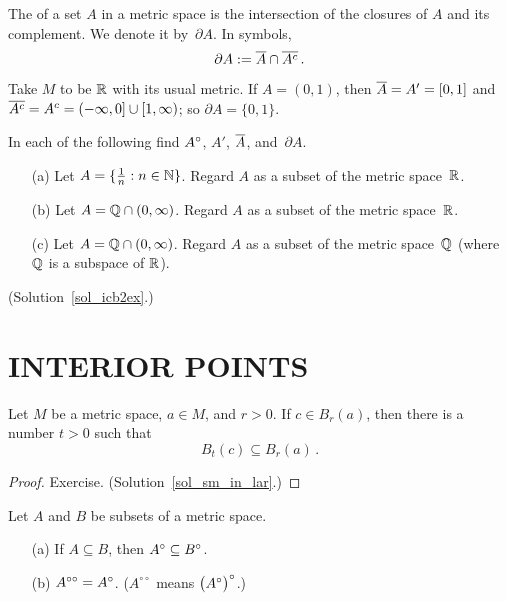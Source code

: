 \begin{defn} The
 of a set $A$ in a metric space is the intersection of the closures of $A$ and
its complement. We denote it
by~$\partial A$. In symbols,
  \[ \partial A := \overline{A} \cap \overline{A^c}\,. \]
\end{defn}

\begin{exam} Take $M$ to be $\mathbb{R}$ with its usual metric. If $A = (0,1)$, then $\overline{A} = A' =
[0,1]$ and $\overline{A^c} = A^c = (-\infty,0] \cup [1,\infty)$; so $\partial A = \{0,1\}$.
\end{exam}

\begin{exer}\label{icb2ex} In each of the following find $A^{\circ}$, $A'$, $\overline{A}$, and~$\partial A$.
 \begin{enumerate}
  \item[(a)] Let $A = \{\frac1n: n \in \mathbb{N}\}$. Regard $A$ as a subset of the metric space~$\mathbb{R}$.
  \item[(b)] Let $A = \mathbb{Q} \cap (0,\infty)$. Regard $A$ as a subset of the metric space~$\mathbb{R}$.
  \item[(c)] Let $A = \mathbb{Q} \cap (0,\infty)$. Regard $A$ as a subset of the metric space~$\mathbb{Q}$
(where $\mathbb{Q}$ is a subspace of $\mathbb{R}$).
 \end{enumerate}
(Solution~\ref{sol_icb2ex}.)
\end{exer}








\section{INTERIOR POINTS}
\begin{lem}\label{sm_in_lar} Let $M$ be a metric space, $a \in M$, and $r > 0$. If $c \in B_r(a)$,
then there is a number $t > 0$ such that
  \[ B_t(c) \subseteq B_r(a)\,. \]
\end{lem}

\begin{proof} Exercise. (Solution~\ref{sol_sm_in_lar}.)  \ns  \end{proof}

\begin{prop}\label{prop_int} Let $A$ and $B$ be subsets of a metric space.
 \begin{enumerate}
  \item[(a)] If $A \subseteq B$, then $A^{\circ} \subseteq B^{\circ}$.
  \item[(b)] $A^{\circ\circ} = A^{\circ}$. \textup{($A^{\circ\circ}$ means
$\bigl(A^{\circ}\bigr)^{\circ}$.)}
 \end{enumerate}
\end{prop}

